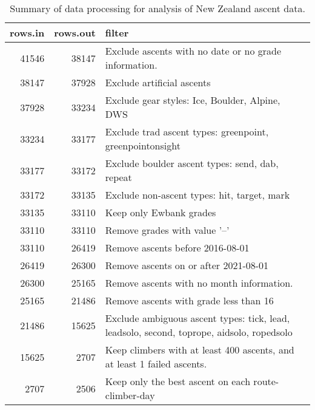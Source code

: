 \begin{table}[ht]
\centering
\begingroup\fontsize{9pt}{10pt}\selectfont
\begin{tabular}{rrl}
  \hline
{\bf rows.in} & {\bf rows.out} & {\bf filter} \\ 
  \hline
41546 & 38147 & Exclude ascents with no date or no grade information. \\ 
  38147 & 37928 & Exclude artificial ascents \\ 
  37928 & 33234 & Exclude gear styles: Ice, Boulder, Alpine, DWS \\ 
  33234 & 33177 & Exclude trad ascent types: greenpoint, greenpointonsight \\ 
  33177 & 33172 & Exclude boulder ascent types: send, dab, repeat \\ 
  33172 & 33135 & Exclude non-ascent types: hit, target, mark \\ 
  33135 & 33110 & Keep only Ewbank grades \\ 
  33110 & 33110 & Remove grades with value '--' \\ 
  33110 & 26419 & Remove ascents before 2016-08-01 \\ 
  26419 & 26300 & Remove ascents on or after 2021-08-01 \\ 
  26300 & 25165 & Remove ascents with no month information. \\ 
  25165 & 21486 & Remove ascents with grade less than 16 \\ 
  21486 & 15625 & Exclude ambiguous ascent types: tick, lead, leadsolo, second, toprope, aidsolo, ropedsolo \\ 
  15625 & 2707 & Keep climbers with at least 400 ascents, and at least 1 failed ascents. \\ 
  2707 & 2506 & Keep only the best ascent on each route-climber-day \\ 
   \hline
\end{tabular}
\endgroup
\caption{Summary of data processing for analysis of New Zealand ascent data.} 
\label{table-data-processing-nz}
\end{table}
